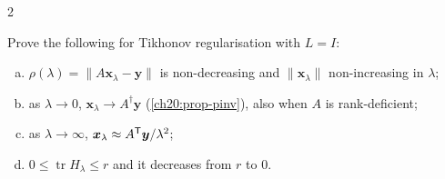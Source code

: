 \begin{paracol}{2}
\begin{exercise}
Prove the following for Tikhonov regularisation with $L=I$:
\begin{enumerate}[(a)]
  \item $\rho(\lambda)=\|A\bm x_\lambda-\bm y\|$ is non-decreasing and $\|\bm x_\lambda\|$ non-increasing in $\lambda$;
  \item as $\lambda\to0$, $\bm x_\lambda\to A^\dagger\bm y$ (\cref{ch20:prop-pinv}), also when $A$ is rank-deficient;
  \item as $\lambda\to\infty$, $\bm x_\lambda\approx A^{\mathsf T}\bm y/\lambda^2$;
  \item $0\le\operatorname{tr}H_\lambda\le r$ and it decreases from $r$ to $0$.
\end{enumerate}
\end{exercise}


\end{paracol}

